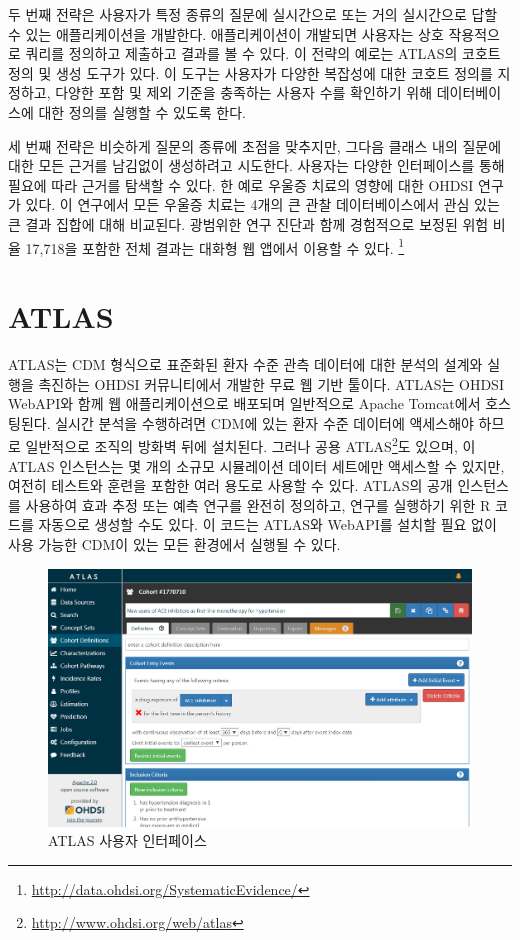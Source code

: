 \documentclass[11pt]{book}
\let\rmarkdownfootnote\footnote%
\def\footnote{\protect\rmarkdownfootnote}
\theoremstyle{definition}
\theoremstyle{definition}
\theoremstyle{definition}
\theoremstyle{remark}
\begin{document}
두 번째 전략은 사용자가 특정 종류의 질문에 실시간으로 또는 거의
실시간으로 답할 수 있는 애플리케이션을 개발한다. 애플리케이션이 개발되면
사용자는 상호 작용적으로 쿼리를 정의하고 제출하고 결과를 볼 수 있다. 이
전략의 예로는 ATLAS의 코호트 정의 및 생성 도구가 있다. 이 도구는
사용자가 다양한 복잡성에 대한 코호트 정의를 지정하고, 다양한 포함 및
제외 기준을 충족하는 사용자 수를 확인하기 위해 데이터베이스에 대한
정의를 실행할 수 있도록 한다.

세 번째 전략은 비슷하게 질문의 종류에 초점을 맞추지만, 그다음 클래스
내의 질문에 대한 모든 근거를 남김없이 생성하려고 시도한다. 사용자는
다양한 인터페이스를 통해 필요에 따라 근거를 탐색할 수 있다. 한 예로
우울증 치료의 영향에 대한 OHDSI 연구가 있다. \citep{schuemie_2018b} 이
연구에서 모든 우울증 치료는 4개의 큰 관찰 데이터베이스에서 관심 있는 큰
결과 집합에 대해 비교된다. 광범위한 연구 진단과 함께 경험적으로 보정된
위험 비율 17,718을 포함한 전체 결과는 대화형 웹 앱에서 이용할 수 있다.
\footnote{\url{http://data.ohdsi.org/SystematicEvidence/}}

\section{ATLAS}\label{atlas}

ATLAS는 CDM 형식으로 표준화된 환자 수준 관측 데이터에 대한 분석의 설계와
실행을 촉진하는 OHDSI 커뮤니티에서 개발한 무료 웹 기반 툴이다. ATLAS는
OHDSI WebAPI와 함께 웹 애플리케이션으로 배포되며 일반적으로 Apache
Tomcat에서 호스팅된다. 실시간 분석을 수행하려면 CDM에 있는 환자 수준
데이터에 액세스해야 하므로 일반적으로 조직의 방화벽 뒤에 설치된다.
그러나 공용 ATLAS\footnote{\url{http://www.ohdsi.org/web/atlas}}도
있으며, 이 ATLAS 인스턴스는 몇 개의 소규모 시뮬레이션 데이터 세트에만
액세스할 수 있지만, 여전히 테스트와 훈련을 포함한 여러 용도로 사용할 수
있다. ATLAS의 공개 인스턴스를 사용하여 효과 추정 또는 예측 연구를 완전히
정의하고, 연구를 실행하기 위한 R 코드를 자동으로 생성할 수도 있다. 이
코드는 ATLAS와 WebAPI를 설치할 필요 없이 사용 가능한 CDM이 있는 모든
환경에서 실행될 수 있다. 

\begin{figure}

{\centering \includegraphics[width=1\linewidth]{images/OhdsiAnalyticsTools/atlas} 

}

\caption{ATLAS 사용자 인터페이스}\label{fig:atlas}
\end{figure}
\end{document}
